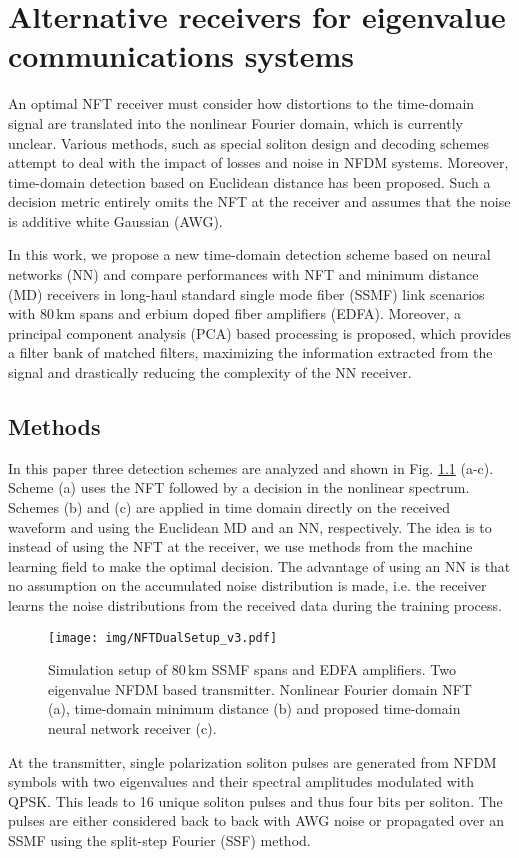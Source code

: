 \chapter{Alternative receivers for eigenvalue communications systems}\label{ch:alternative_receivers}
An optimal NFT receiver must consider how distortions to the time-domain signal are translated into the nonlinear Fourier domain, which is currently unclear. Various methods, such as special soliton design and decoding schemes attempt to deal with the impact of losses and noise in NFDM systems\cite{aref16,gui17}.
Moreover, time-domain detection based on Euclidean distance has been proposed\cite{buelow16}. Such a decision metric entirely omits the NFT at the receiver and assumes that the noise is additive white Gaussian (AWG).

In this work, we propose a new time-domain detection scheme based on neural networks (NN)\cite{bishop06} and compare performances with NFT and minimum distance (MD) receivers in long-haul standard single mode fiber (SSMF) link scenarios with 80\,km spans and erbium doped fiber amplifiers (EDFA). Moreover, a principal component analysis (PCA) based processing is proposed, which provides a filter bank of matched filters, maximizing the information extracted from the signal and drastically reducing the complexity of the NN receiver.

\section{Methods}
In this paper three detection schemes are analyzed and shown in Fig. \ref{fig:setup} (a-c).
Scheme (a) uses the NFT followed by a decision in the nonlinear spectrum. Schemes (b) and (c) are applied in time domain directly on the received waveform and using the Euclidean MD and an NN, respectively.
The idea is to instead of using the NFT at the receiver, we use methods from the machine learning field to make the optimal decision.
The advantage of using an NN is that no assumption on the accumulated noise distribution is made, i.e. the receiver learns the noise distributions from the received data during the training process.
\begin{figure}[t]
  \centering
  \texttt{[image: img/NFTDualSetup\_v3.pdf]}
\caption{Simulation setup of 80\,km SSMF spans and EDFA amplifiers. Two eigenvalue NFDM based transmitter. Nonlinear Fourier domain NFT (a), time-domain minimum distance (b) and proposed time-domain neural network receiver (c).}
\label{fig:setup}
\end{figure}
%
At the transmitter, single polarization soliton pulses are generated from NFDM symbols with two eigenvalues and their spectral amplitudes modulated with QPSK. This leads to 16 unique soliton pulses and thus four bits per soliton. The pulses are either considered back to back with AWG noise or propagated over an SSMF using the split-step Fourier (SSF) method.

